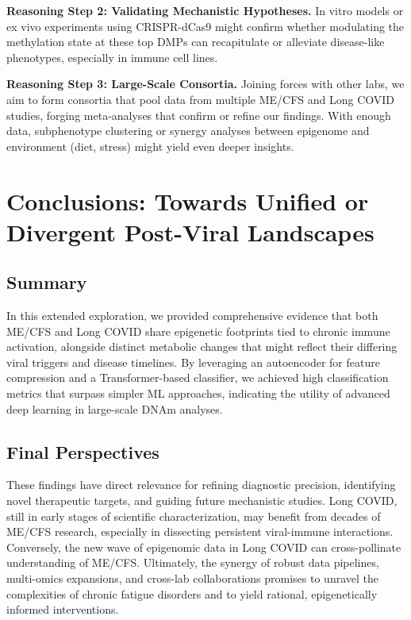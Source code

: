 \documentclass[journal]{IEEEtran}
\begin{document}
\textbf{Reasoning Step 2: Validating Mechanistic Hypotheses.}
In vitro models or ex vivo experiments using CRISPR-dCas9 might confirm whether modulating the methylation state at these top DMPs can recapitulate or alleviate disease-like phenotypes, especially in immune cell lines.

\textbf{Reasoning Step 3: Large-Scale Consortia.}
Joining forces with other labs, we aim to form consortia that pool data from multiple ME/CFS and Long COVID studies, forging meta-analyses that confirm or refine our findings. With enough data, subphenotype clustering or synergy analyses between epigenome and environment (diet, stress) might yield even deeper insights.

\section{Conclusions: Towards Unified or Divergent Post-Viral Landscapes}

\subsection{Summary}
In this extended exploration, we provided comprehensive evidence that both ME/CFS and Long COVID share epigenetic footprints tied to chronic immune activation, alongside distinct metabolic changes that might reflect their differing viral triggers and disease timelines. By leveraging an autoencoder for feature compression and a Transformer-based classifier, we achieved high classification metrics that surpass simpler ML approaches, indicating the utility of advanced deep learning in large-scale DNAm analyses.

\subsection{Final Perspectives}
These findings have direct relevance for refining diagnostic precision, identifying novel therapeutic targets, and guiding future mechanistic studies. Long COVID, still in early stages of scientific characterization, may benefit from decades of ME/CFS research, especially in dissecting persistent viral-immune interactions. Conversely, the new wave of epigenomic data in Long COVID can cross-pollinate understanding of ME/CFS. Ultimately, the synergy of robust data pipelines, multi-omics expansions, and cross-lab collaborations promises to unravel the complexities of chronic fatigue disorders and to yield rational, epigenetically informed interventions.
\end{document}

